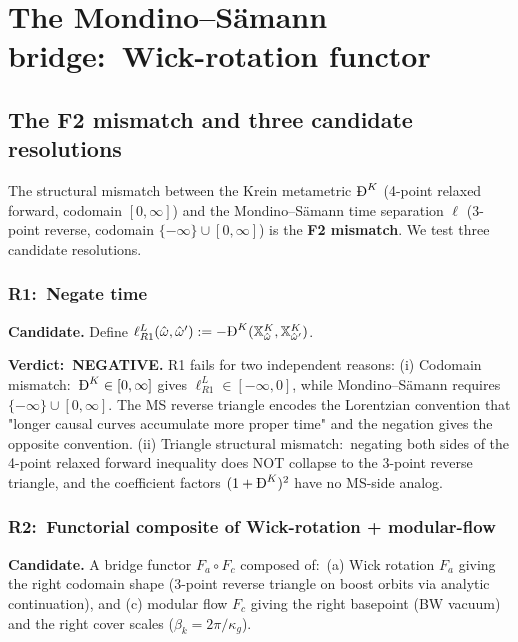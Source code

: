 \documentclass[11pt,a4paper]{article}
\theoremstyle{plain}
\theoremstyle{definition}
\newcommand{\BigDeth}{\text{\DJ}^{K}}
\newcommand{\kappag}{\kappa_{g}}
\begin{document}
\section{The Mondino--S\"amann bridge:\ Wick-rotation
functor}\label{sec:bridge}

\subsection{The F2 mismatch and three candidate
resolutions}\label{sec:f2_resolution}

The structural mismatch between the Krein metametric $\BigDeth$ (4-point
relaxed forward, codomain $[0, \infty]$) and the Mondino--S\"amann
time separation $\ell$ (3-point reverse, codomain $\{-\infty\}\cup
[0, \infty]$) is the \textbf{F2 mismatch}. We test three candidate
resolutions.

\subsubsection{R1:\ Negate time}\label{sec:r1_test}

\textbf{Candidate.} Define $\ell^{L}_{R1}(\hat{\omega}, \hat{\omega}')
:= -\BigDeth(\mathbb{X}^{K}_{\hat{\omega}}, \mathbb{X}^{K}_{\hat{\omega}'})$.

\textbf{Verdict:\ NEGATIVE.} R1 fails for two independent reasons:
(i) Codomain mismatch:\ $\BigDeth \in [0, \infty]$ gives
$\ell^{L}_{R1} \in [-\infty, 0]$, while Mondino--S\"amann requires
$\{-\infty\}\cup [0, \infty]$. The MS reverse triangle encodes the
Lorentzian convention that "longer causal curves accumulate more
proper time" and the negation gives the opposite convention.
(ii) Triangle structural mismatch:\ negating both sides of the
4-point relaxed forward inequality does NOT collapse to the 3-point
reverse triangle, and the coefficient factors $(1 + \BigDeth)^{2}$
have no MS-side analog.

\subsubsection{R2:\ Functorial composite of Wick-rotation +
modular-flow}\label{sec:r2_test}

\textbf{Candidate.} A bridge functor $F_{a} \circ F_{c}$ composed of:\
(a) Wick rotation $F_{a}$ giving the right codomain shape (3-point
reverse triangle on boost orbits via analytic continuation), and
(c) modular flow $F_{c}$ giving the right basepoint (BW vacuum) and
the right cover scales ($\beta_{k} = 2\pi/\kappag$).
\end{document}
